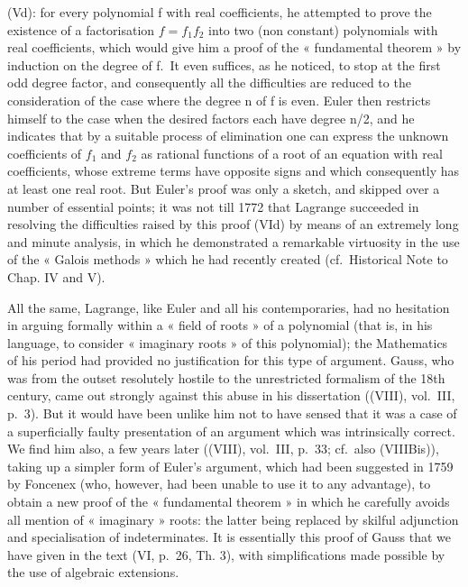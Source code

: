 (Vd): for every polynomial f with real coefficients, he attempted to prove the existence of a factorisation \(f = f_{1}f_{2}\) into two (non constant) polynomials with real coefficients, which would give him a proof of the « fundamental theorem » by induction on the degree of f.~It even suffices, as he noticed, to stop at the first odd degree factor, and consequently all the difficulties are reduced to the consideration of the case where the degree n of f is even. Euler then restricts himself to the case when the desired factors each have degree n/2, and he indicates that by a suitable process of elimination one can express the unknown coefficients of \(f_{1}\) and \(f_{2}\) as rational functions of a root of an equation with real coefficients, whose extreme terms have opposite signs and which consequently has at least one real root. But Euler's proof was only a sketch, and skipped over a number of essential points; it was not till 1772 that Lagrange succeeded in resolving the difficulties raised by this proof (VId) by means of an extremely long and minute analysis, in which he demonstrated a remarkable virtuosity in the use of the « Galois methods » which he had recently created (cf.~Historical Note to Chap. IV and V).

All the same, Lagrange, like Euler and all his contemporaries, had no hesitation in arguing formally within a « field of roots » of a polynomial (that is, in his language, to consider « imaginary roots » of this polynomial); the Mathematics of his period had provided no justification for this type of argument. Gauss, who was from the outset resolutely hostile to the unrestricted formalism of the 18th century, came out strongly against this abuse in his dissertation ((VIII), vol.~III, p.~3). But it would have been unlike him not to have sensed that it was a case of a superficially faulty presentation of an argument which was intrinsically correct. We find him also, a few years later ((VIII), vol.~III, p.~33; cf.~also (VIIIBis)), taking up a simpler form of Euler's argument, which had been suggested in 1759 by Foncenex (who, however, had been unable to use it to any advantage), to obtain a new proof of the « fundamental theorem » in which he carefully avoids all mention of « imaginary » roots: the latter being replaced by skilful adjunction and specialisation of indeterminates. It is essentially this proof of Gauss that we have given in the text (VI, p.~26, Th. 3), with simplifications made possible by the use of algebraic extensions.

